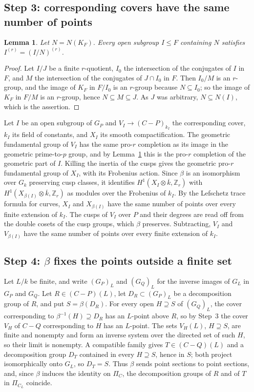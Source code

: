 \documentclass[11pt]{amsart}
\newtheorem{lemma}[thm]{Lemma}
\theoremstyle{remark}
\newcommand{\Z}{\mathbb Z}
\begin{document}
\subsection{Step 3: corresponding covers have the same number of points}

\begin{lemma}\label{lem:rquot}
Let $N=N(K_F)$. Every open subgroup $I\le F$ containing $N$ satisfies $I^{(r)}=(I/N)^{(r)}$.
\end{lemma}

\begin{proof}
Let $I/J$ be a finite $r$-quotient, $I_0$ the intersection of the conjugates of $I$ in $F$, and $M$ the intersection of the conjugates of $J\cap I_0$ in $F$. Then $I_0/M$ is an $r$-group, and the image of $K_F$ in $F/I_0$ is an $r$-group because $N\subseteq I_0$; so the image of $K_F$ in $F/M$ is an $r$-group, hence $N\subseteq M\subseteq J$. As $J$ was arbitrary, $N\subseteq N(I)$, which is the assertion.
\end{proof}

Let $I$ be an open subgroup of $G_P$ and $V_I\to(C-P)_{k_I}$ the corresponding cover, $k_I$ its field of constants, and $X_I$ its smooth compactification. The geometric fundamental group of $V_I$ has the same pro-$r$ completion as its image in the geometric prime-to-$p$ group, and by Lemma~\ref{lem:rquot} this is the pro-$r$ completion of the geometric part of $I$. Killing the inertia of the cusps gives the geometric pro-$r$ fundamental group of $X_I$, with its Frobenius action. Since $\beta$ is an isomorphism over $G_k$ preserving cusp classes, it identifies $H^1(X_I\otimes\overline k,\Z_r)$ with $H^1(X_{\beta(I)}\otimes\overline k,\Z_r)$ as modules over the Frobenius of $k_I$. By the Lefschetz trace formula for curves, $X_I$ and $X_{\beta(I)}$ have the same number of points over every finite extension of $k_I$. The cusps of $V_I$ over $P$ and their degrees are read off from the double cosets of the cusp groups, which $\beta$ preserves. Subtracting, $V_I$ and $V_{\beta(I)}$ have the same number of points over every finite extension of $k_I$.

\subsection{Step 4: $\beta$ fixes the points outside a finite set}
Let $L/k$ be finite, and write $(G_P)_L$ and $(G_Q)_L$ for the inverse images of $G_L$ in $G_P$ and $G_Q$. Let $R\in(C-P)(L)$, let $D_R\subset (G_P)_L$ be a decomposition group of $R$, and put $S=\beta(D_R)$. For every open $H\supseteq S$ of $(G_Q)_L$, the cover corresponding to $\beta^{-1}(H)\supseteq D_R$ has an $L$-point above $R$, so by Step~3 the cover $V_H$ of $C-Q$ corresponding to $H$ has an $L$-point. The sets $V_H(L)$, $H\supseteq S$, are finite and nonempty and form an inverse system over the directed set of such $H$, so their limit is nonempty. A compatible family gives $T\in(C-Q)(L)$ and a decomposition group $D_T$ contained in every $H\supseteq S$, hence in $S$; both project isomorphically onto $G_L$, so $D_T=S$. Thus $\beta$ sends point sections to point sections, and, since $\beta$ induces the identity on $\Pi_C$, the decomposition groups of $R$ and of $T$ in $\Pi_{C_L}$ coincide.
\end{document}
